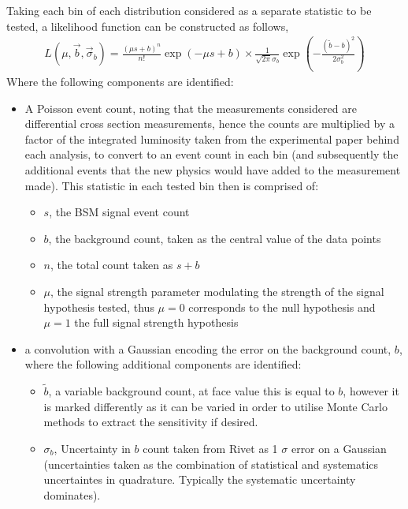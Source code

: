 \documentclass[floatfix]{article}
\begin{document}
Taking each bin of each distribution considered as a separate statistic to be tested, a likelihood function can be constructed as follows,
\begin{align}
L(\mu, \vec{b}, \vec{\sigma}_{b}) = { \frac{(\mu s + b)^{n}}{n!} \exp\left(-\mu s + b\right) \times \frac{1}{\sqrt{2 \pi} \sigma_{b}} \exp\left(-\frac{(\tilde{b} - b)^{2}}{2 \sigma_{b}^{2}}\right)}
\end{align}
Where the following components are identified:
\begin{itemize}
\item A Poisson event count, noting that the measurements considered are differential cross section measurements, hence the counts are multiplied by a factor of the integrated luminosity taken from the experimental paper behind each analysis, to convert to an event count in each bin (and subsequently the additional events that the new physics would have added to the measurement made). This statistic in each tested bin then is comprised of:
\begin{itemize}
\item $s$, the BSM signal event count
\item $b$, the background count, taken as the central value of the data points
\item $n$, the total count taken as $s+b$
\item $\mu$, the signal strength parameter modulating the strength of the signal hypothesis tested, thus $\mu=0$ corresponds to the null hypothesis and $\mu=1$ the full signal strength hypothesis
\end{itemize}
\item a convolution with a Gaussian encoding the error on the background count, $b$, where the following additional components are identified:
\begin{itemize}
\item $\tilde{b}$, a variable background count, at face value this is equal to $b$, however it is marked differently as it can be varied in order to utilise Monte Carlo methods to extract the sensitivity if desired.
\item $\sigma_{b}$, Uncertainty in $b$ count taken from Rivet as 1 $\sigma$ error on a Gaussian (uncertainties taken as the combination of statistical and systematics uncertaintes in quadrature. Typically the systematic uncertainty dominates).
\end{itemize}
\end{itemize}
\end{document}
